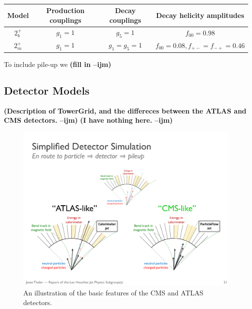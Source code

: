 \documentclass[11pt,letterpaper]{article}
\newcommand{\ijm}[1]{\textbf{\textcolor{llblue}{(#1 --ijm)}}}
\begin{document}
\begin{table}[ht]
\caption{}
\centering
\begin{tabular}{c c c c}
\hline\hline
Model	&Production couplings	&Decay couplings	&Decay helicity amplitudes 	\\
\hline
$2_b^+$	& $g_1=1$		& $g_5=1$		& $f_{00}=0.98$			\\
$2_m^+$	& $g_1=1$		& $g_1=g_5=1$		& $f_{00}=0.08,f_{+-}=f_{-+}=0.46$\\	
\hline
\end{tabular}
\label{table:polarisedSamples}
\end{table}

To include pile-up we \ijm{fill in}


\subsection{Detector Models}\label{sec:det_model}

\ijm{Description of TowerGrid, and the differeces between the ATLAS and CMS detectors. }
\ijm{I have nothing here.}

\begin{figure}
\begin{center}
\includegraphics[width=1.0\columnwidth]{figures/CMS_vs_ATLAS_detector}
\end{center}
\caption{An illustration of the basic features of the CMS and ATLAS detectors.}
\end{figure}

\end{document}
